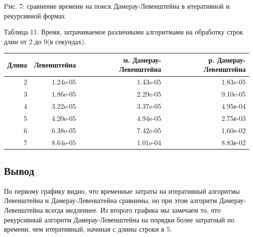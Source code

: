 \documentclass[a4paper, 14pt]{article}
\begin{document}
\begin{center}

\begin{center}
Pис. 7: сравнение времени на поиск Дамерау-Левенштейна в итеративной и рекурсивной формах
\end{center}
\begin{center}
        
      \begin{center}
      \newpage
  	Таблица 11. Время, затрачиваемое различными алгоритмами на обработку строк длин от 2 до 9(в секундах).
	\end{center}
	    \begin{tabular}{ | r | r | r | r | }
        \hline
Длина & Левенштейна & м. Дамерау-Левенштейна & р. Дамерау-Левенштейна \\ \hline
2 & 1.24e-05 & 1.43e-05 & 1.83e-05\\
3 & 1.86e-05 & 2.29e-05 & 9.10e-05\\
4 & 3.22e-05 & 3.37e-05 & 4.95е-04\\
5 & 4.20e-05 & 4.94e-05 & 2.75е-03\\
6 & 6.38e-05 & 7.42e-05 & 1.60e-02\\
7 & 8.64e-05 & 1.01e-04 & 8.83е-02\\
\hline
        \end{tabular}

\end{center}
	\begin{flushleft}
	\begin{center}
	\subsection{Вывод}
	\end{center}	
	По первому графику видно, что временные затраты на итеративный алгоритмы Левенштейна и Дамерау-Левенштейна сравнимы, но при этом алгоритм Дамерау-Левенштейна всегда медленнее. Из второго графика мы замечаем то, что рекурсивный алгоритм Дамерау-Левенштейна на порядки более затратный по времени, чем итеративный, начиная с длины строки в 5.
	\end{flushleft}
        
    \end{center}
\end{document}
